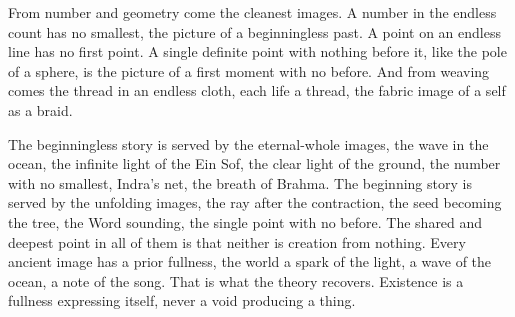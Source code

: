 From number and geometry come the cleanest images. A number in the endless count has no smallest, the picture of
a beginningless past. A point on an endless line has no first point. A single definite point with nothing before
it, like the pole of a sphere, is the picture of a first moment with no before. And from weaving comes the thread
in an endless cloth, each life a thread, the fabric image of a self as a braid.

The beginningless story is served by the eternal-whole images, the wave in the ocean, the infinite light of the
Ein Sof, the clear light of the ground, the number with no smallest, Indra's net, the breath of Brahma. The
beginning story is served by the unfolding images, the ray after the contraction, the seed becoming the tree, the
Word sounding, the single point with no before. The shared and deepest point in all of them is that neither is
creation from nothing. Every ancient image has a prior fullness, the world a spark of the light, a wave of the
ocean, a note of the song. That is what the theory recovers. Existence is a fullness expressing itself, never a
void producing a thing.
